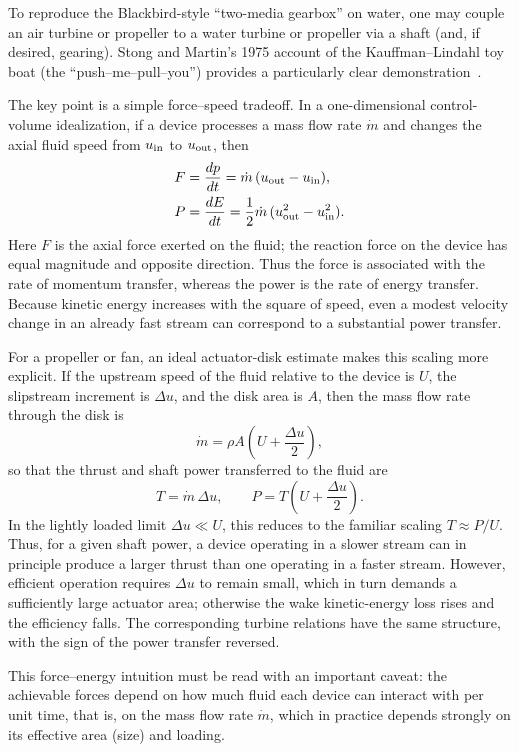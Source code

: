 \documentclass[reprint,aps,pra,longbibliography]{revtex4-2}
\begin{document}
To reproduce the Blackbird-style ``two-media gearbox'' on water, one may couple
an air turbine or propeller to a water turbine or propeller via a shaft (and,
if desired, gearing).  Stong and Martin's 1975 account of the Kauffman--Lindahl toy boat
(the ``push--me--pull--you'') provides a particularly clear
demonstration~\cite{Stong1975}.

The key point is a simple force--speed tradeoff. In a one-dimensional
control-volume idealization, if a device processes a mass flow rate \(\dot m\)
and changes the axial fluid speed from \(u_{\rm in}\) to \(u_{\rm out}\), then
\begin{align}
F &= \frac{dp}{dt}
   = \dot m \,(u_{\rm out}-u_{\rm in}), \\
P &= \frac{dE}{dt}
   = \frac{1}{2}\dot m \,(u_{\rm out}^2-u_{\rm in}^2).
\end{align}
Here \(F\) is the axial force exerted on the fluid; the reaction force on the
device has equal magnitude and opposite direction. Thus the force is associated
with the rate of momentum transfer, whereas the power is the rate of energy
transfer. Because kinetic energy increases with the square of speed, even a
modest velocity change in an already fast stream can correspond to a substantial
power transfer.

For a propeller or fan, an ideal actuator-disk estimate makes this scaling more
explicit. If the upstream speed of the fluid relative to the device is \(U\),
the slipstream increment is \(\Delta u\), and the disk area is \(A\), then the
mass flow rate through the disk is
\[
\dot m = \rho A\!\left(U+\frac{\Delta u}{2}\right),
\]
so that the thrust and shaft power transferred to the fluid are
\[
T = \dot m\,\Delta u,
\qquad
P = T\!\left(U+\frac{\Delta u}{2}\right).
\]
In the lightly loaded limit \(\Delta u \ll U\), this reduces to the familiar
scaling
\(
T \approx  {P}/{U}
\).
Thus, for a given shaft power, a device operating in a slower stream can in
principle produce a larger thrust than one operating in a faster stream.
However, efficient operation requires \(\Delta u\) to remain small, which in
turn demands a sufficiently large actuator area; otherwise the wake
kinetic-energy loss rises and the efficiency falls. The corresponding turbine
relations have the same structure, with the sign of the power transfer reversed.

This force--energy intuition must be read
with an important caveat: the achievable forces depend on how much fluid each
device can interact with per unit time, that is, on the mass flow rate
\(\dot m\), which in practice depends strongly on
its effective area (size) and loading.
\end{document}
